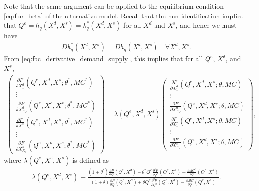 \documentclass[11pt, a4paper]{article}
\theoremstyle{remark}
\begin{document}
Note that the same argument can be applied to the equilibrium condition \eqref{eq:foc_beta} of the alternative model.
Recall that the non-identification implies that $Q^e = h_q(X^{d}, X^{s}) = h_q^{*}(X^{d}, X^{s})$ for all $X^{d}$ and $X^{s}$, and hence we must have
\begin{align}
    Dh_q^{*}(X^{d}, X^{s}) = Dh_q(X^{d}, X^{s}) \quad \forall X^{d}, X^{s}. \label{eq:observale_equivalence_derivative}
\end{align}
From \eqref{eq:foc_derivative_demand_supply}, this implies that for all $Q^e$, $X^{d}$, and $X^{s}$,
\begin{align}
    \begin{pmatrix}
        \frac{\partial F}{\partial X^{d}_{1}}(Q^e, X^{d}, X^{s}; \theta^{*}, MC^{*})\\
        \vdots \\
        \frac{\partial F}{\partial X^{d}_{K_d}}(Q^e, X^{d}, X^{s}; \theta^{*}, MC^{*})\\
        \frac{\partial F}{\partial X^{s}_{1}}(Q^e, X^{d}, X^{s}; \theta^{*}, MC^{*})\\
        \vdots \\
        \frac{\partial F}{\partial X^{s}_{K_s}}(Q^e, X^{d}, X^{s}; \theta^{*}, MC^{*})
    \end{pmatrix}
    = \lambda(Q^e, X^{d}, X^{s})
    \begin{pmatrix}
        \frac{\partial F}{\partial X^{d}_{1}}(Q^e, X^{d}, X^{s}; \theta, MC)\\
        \vdots \\
        \frac{\partial F}{\partial X^{d}_{K_d}}(Q^e, X^{d}, X^{s}; \theta, MC)\\
        \frac{\partial F}{\partial X^{s}_{1}}(Q^e, X^{d}, X^{s}; \theta, MC)\\
        \vdots \\
        \frac{\partial F}{\partial X^{s}_{K_s}}(Q^e, X^{d}, X^{s}; \theta, MC)
    \end{pmatrix},\label{eq:foc_derivative_demand_supply_lambda}
\end{align}
where $\lambda(Q^e, X^{d}, X^{s})$ is defined as
\begin{align}
    \lambda(Q^e, X^{d}, X^{s}) \equiv \frac{(1+\theta^{*})\frac{\partial P}{\partial Q}(Q^e, X^{d}) + \theta^{*} Q^e\frac{\partial^2 P}{\partial Q^2}(Q^e, X^{d}) - \frac{\partial MC^{*}}{\partial Q}(Q^e, X^{s})}{(1+\theta)\frac{\partial P}{\partial Q}(Q^e, X^{d}) + \theta Q^e\frac{\partial^2 P}{\partial Q^2}(Q^e, X^{d}) - \frac{\partial MC}{\partial Q}(Q^e, X^{s})}. \label{eq:lambda_foc}
\end{align}
\end{document}
